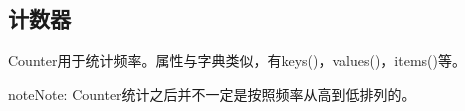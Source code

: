 \documentclass[letterpaper,10pt,english]{sphinxmanual}
\begin{document}
\subsection{计数器}
\label{\detokenize{python/11_dataStruct:id8}}
%
\begin{sphinxVerbatim}[commandchars=\\\{\}]
   
\end{sphinxVerbatim}

Counter用于统计频率。属性与字典类似，有keys()，values()，items()等。

\begin{sphinxadmonition}{note}{Note:}
Counter统计之后并不一定是按照频率从高到低排列的。
\end{sphinxadmonition}
\end{document}
